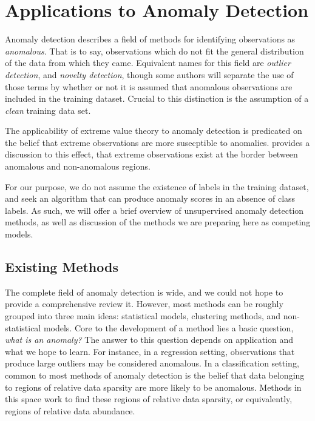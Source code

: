 \section{Applications to Anomaly Detection}
\label{sec:anomaly}
Anomaly detection describes a field of methods for identifying observations as \emph{anomalous}.  That
  is to say, observations which do not fit the general distribution of the data from which they came.
  Equivalent names for this field are \emph{outlier detection}, and \emph{novelty detection}, though
  some authors will separate the use of those terms by whether or not it is assumed that anomalous
  observations are included in the training dataset.  Crucial to this distinction is the assumption
  of a \emph{clean} training data set.

The applicability of extreme value theory to anomaly detection is predicated on the belief that
  extreme observations are more susecptible to anomalies.  \cite{goix2017} provides a discussion to
  this effect, that extreme observations exist at the border between anomalous and non-anomalous regions.

For our purpose, we do not assume the existence of labels in the training dataset, and seek an
  algorithm that can produce anomaly scores in an absence of class labels. As such, we will offer
  a brief overview of unsupervised anomaly detection methods, as well as discussion of the methods
  we are preparing here as competing models.

\subsection{Existing Methods}
The complete field of anomaly detection is wide, and we could not hope to provide a comprehensive review
  it.  However, most methods can be roughly grouped into three main ideas: statistical models, clustering
  methods, and non-statistical models. Core to the development of a method lies a basic question,
  \emph{what is an anomaly?}  The answer to this question depends on application and what we hope to
  learn.  For instance, in a regression setting, observations that produce large outliers may be considered
  anomalous.  In a classification setting, common to most methods of anomaly detection is the belief
  that data belonging to regions of relative data sparsity are more likely to be anomalous.  Methods in
  this space work to find these regions of relative data sparsity, or equivalently, regions of relative
  data abundance.

